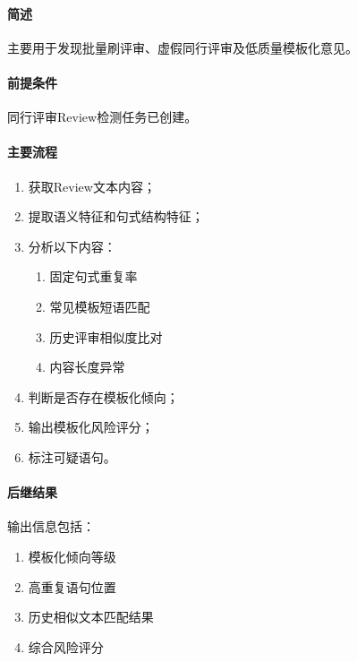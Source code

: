 \paragraph*{简述}


主要用于发现批量刷评审、虚假同行评审及低质量模板化意见。

\paragraph*{前提条件}

同行评审Review检测任务已创建。

\paragraph*{主要流程}

\begin{enumerate}
    \item 获取Review文本内容；
    \item 提取语义特征和句式结构特征；
    \item 分析以下内容：
    \begin{enumerate}
        \item 固定句式重复率
        \item 常见模板短语匹配
        \item 历史评审相似度比对
        \item 内容长度异常
    \end{enumerate}
    \item 判断是否存在模板化倾向；
    \item 输出模板化风险评分；
    \item 标注可疑语句。
\end{enumerate}

\paragraph*{后继结果}

输出信息包括：

\begin{enumerate}
    \item 模板化倾向等级
    \item 高重复语句位置
    \item 历史相似文本匹配结果
    \item 综合风险评分
\end{enumerate}

